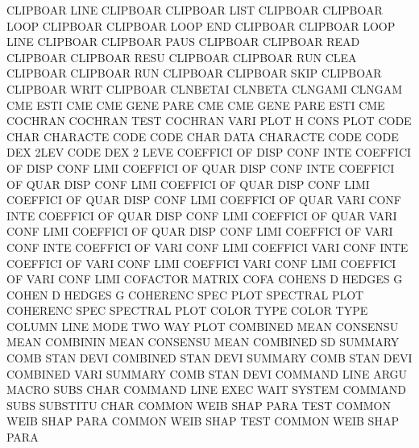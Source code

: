CLIPBOAR LINE                           CLIPBOAR
CLIPBOAR LIST                           CLIPBOAR
CLIPBOAR LOOP                           CLIPBOAR
CLIPBOAR LOOP END                       CLIPBOAR
CLIPBOAR LOOP LINE                      CLIPBOAR
CLIPBOAR PAUS                           CLIPBOAR
CLIPBOAR READ                           CLIPBOAR
CLIPBOAR RESU                           CLIPBOAR
CLIPBOAR RUN  CLEA                      CLIPBOAR
CLIPBOAR RUN                            CLIPBOAR
CLIPBOAR SKIP                           CLIPBOAR
CLIPBOAR WRIT                           CLIPBOAR
CLNBETAI                                CLNBETA
CLNGAMI                                 CLNGAM
CME      ESTI                           CME
CME      GENE PARE                      CME
CME      GENE PARE ESTI                 CME
COCHRAN                                 COCHRAN  TEST
COCHRAN  VARI PLOT                      H        CONS PLOT
CODE     CHAR                           CHARACTE CODE
CODE     CHAR DATA                      CHARACTE CODE
CODE     DEX  2LEV                      CODE     DEX  2    LEVE
COEFFICI OF   DISP CONF INTE            COEFFICI OF   DISP CONF LIMI
COEFFICI OF   QUAR DISP CONF INTE       COEFFICI OF   QUAR DISP CONF LIMI
COEFFICI OF   QUAR DISP CONF LIMI       COEFFICI OF   QUAR DISP CONF LIMI
COEFFICI OF   QUAR VARI CONF INTE       COEFFICI OF   QUAR DISP CONF LIMI
COEFFICI OF   QUAR VARI CONF LIMI       COEFFICI OF   QUAR DISP CONF LIMI
COEFFICI OF   VARI CONF INTE            COEFFICI OF   VARI CONF LIMI
COEFFICI VARI CONF INTE                 COEFFICI OF   VARI CONF LIMI
COEFFICI VARI CONF LIMI                 COEFFICI OF   VARI CONF LIMI
COFACTOR                                MATRIX   COFA
COHENS   D                              HEDGES   G
COHEN    D                              HEDGES   G
COHERENC SPEC PLOT                      SPECTRAL PLOT
COHERENC SPEC                           SPECTRAL PLOT
COLOR    TYPE                           COLOR    TYPE
COLUMN   LINE MODE                      TWO      WAY  PLOT
COMBINED MEAN                           CONSENSU MEAN
COMBININ MEAN                           CONSENSU MEAN
COMBINED SD                             SUMMARY  COMB STAN DEVI
COMBINED STAN DEVI                      SUMMARY  COMB STAN DEVI
COMBINED VARI                           SUMMARY  COMB STAN DEVI
COMMAND  LINE ARGU                      MACRO    SUBS CHAR
COMMAND  LINE EXEC WAIT                 SYSTEM
COMMAND  SUBS                           SUBSTITU CHAR
COMMON   WEIB SHAP PARA TEST            COMMON   WEIB SHAP PARA
COMMON   WEIB SHAP TEST                 COMMON   WEIB SHAP PARA
